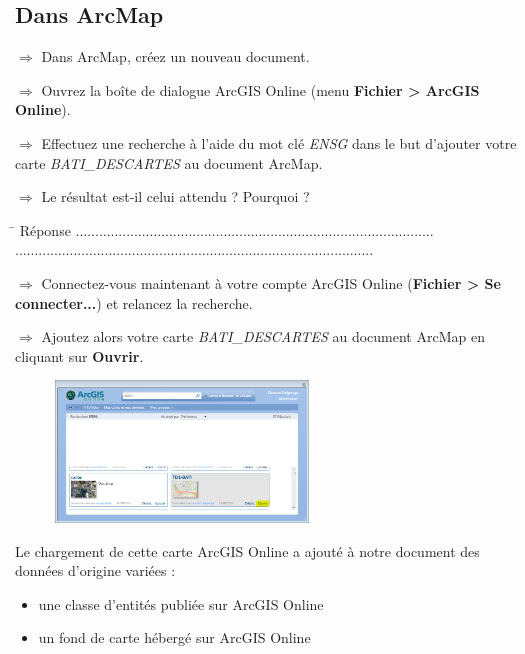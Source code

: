 \documentclass[11pt]{article}
\newcommand{\action}{$\Rightarrow$ }
\newcommand{\reponse}{
	\begin{tabbing}
	\hspace{2cm}\=\kill
	Réponse \> ............................................................................................ \\
 	\> ............................................................................................
	\end{tabbing}
}
\begin{document}
\subsection{Dans ArcMap}
\action Dans ArcMap, créez un nouveau document.

\action Ouvrez la  boîte de dialogue ArcGIS Online (menu \textbf{Fichier > ArcGIS Online}).

\action Effectuez une recherche à l'aide du mot clé \textit{ENSG} dans le but d'ajouter votre carte \textit{BATI\_DESCARTES} au document ArcMap.

\action Le résultat est-il celui attendu ? Pourquoi ?

\reponse

\action Connectez-vous maintenant à votre compte ArcGIS Online (\textbf{Fichier > Se connecter...}) et relancez la recherche.

\action Ajoutez alors votre carte \textit{BATI\_DESCARTES} au document ArcMap en cliquant sur \textbf{Ouvrir}.
\begin{figure}[H]
	\center \includegraphics[width=0.6\textwidth]{img/cours3/am_ouvrir_service_ago.png} \\
\end{figure}

Le chargement de cette carte ArcGIS Online a ajouté à notre document des données d'origine variées :
\begin{itemize}
	\item une classe d'entités publiée sur ArcGIS Online
	\item un fond de carte hébergé sur ArcGIS Online
\end{itemize}
\end{document}
